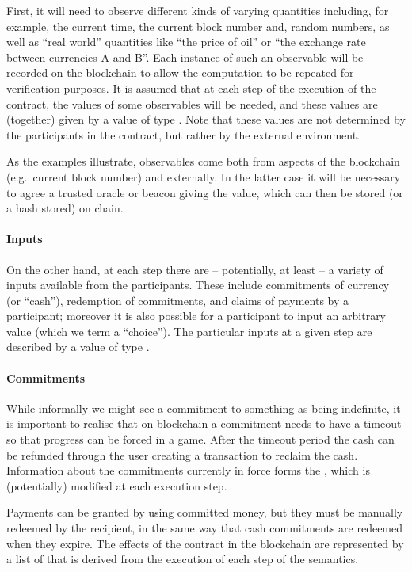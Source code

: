 \documentclass[
      acmsmall
    , screen
    , review=true
  ]{acmart}
\begin{document}
First, it will need to observe different kinds of varying quantities including, for example, the current time, the current block number and, random numbers, as well as ``real world'' quantities like ``the price of oil'' or ``the exchange rate between currencies A and B''. Each instance of such an observable will be recorded on the blockchain to allow the computation to be repeated for verification purposes. It is assumed that at each step of the execution of the contract, the values of some observables will be needed, and these values are (together) given by a value of type . Note that these values are not determined by the participants in the contract, but rather by the external environment.

As the examples illustrate, observables come both from aspects of the blockchain (e.g.\ current block number) and externally. In the latter case it will be necessary to agree a trusted oracle or beacon giving the value, which can then be stored (or a hash stored) on chain.

\paragraph{Inputs}


On the other hand, at each step there are -- potentially, at least -- a variety of inputs available from the participants. These include commitments of currency (or ``cash''), redemption of commitments, and claims of payments by a participant; moreover it is also possible for a participant to input an arbitrary value (which we term a ``choice''). The particular inputs at a given step are described by a value of type .

\paragraph{Commitments}


While informally we might see a commitment to something as being indefinite, it is important to realise that on blockchain a commitment needs to have a timeout so that progress can be forced in a game. After the timeout period the cash can be refunded through the user creating a transaction to reclaim the cash.
Information about the commitments currently in force forms the , which is (potentially) modified at each execution step. 

Payments can be granted by using committed money, but they must be manually redeemed by the recipient, in the 
same way that cash commitments are redeemed when they expire. The effects of the contract in the blockchain are 
represented by a list  of  that is derived from the execution of each step of the semantics.
\end{document}
